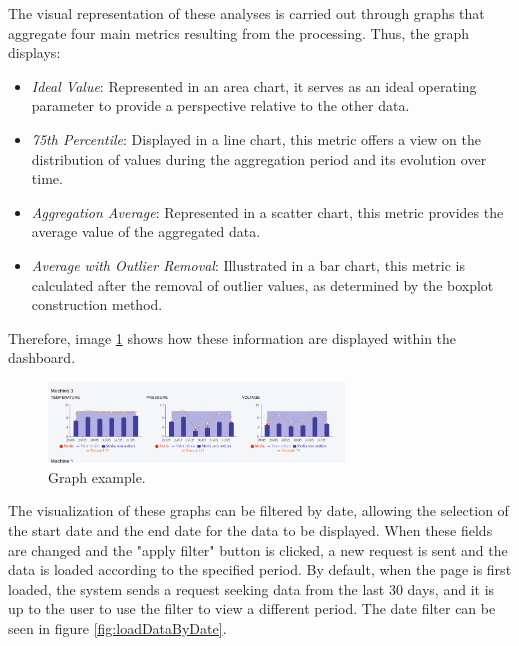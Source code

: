 The visual representation of these analyses is carried out through graphs that aggregate four main metrics resulting from the processing. Thus, the graph displays:

\begin{itemize}
    \item \textit{Ideal Value}: Represented in an area chart, it serves as an ideal operating parameter to provide a perspective relative to the other data.
    \item \textit{75th Percentile}: Displayed in a line chart, this metric offers a view on the distribution of values during the aggregation period and its evolution over time.
    \item \textit{Aggregation Average}: Represented in a scatter chart, this metric provides the average value of the aggregated data.
    \item \textit{Average with Outlier Removal}: Illustrated in a bar chart, this metric is calculated after the removal of outlier values, as determined by the boxplot construction method.
\end{itemize}

Therefore, image \ref{fig:graphData} shows how these information are displayed within the dashboard.

\begin{figure}[htbp]
	\centering
	\includegraphics[width=0.7\textwidth]{images/graphData.png}
	\caption{Graph example.}
	\label{fig:graphData}
\end{figure}


The visualization of these graphs can be filtered by date, allowing the selection of the start date and the end date for the data to be displayed. When these fields are changed and the "apply filter" button is clicked, a new request is sent and the data is loaded according to the specified period. By default, when the page is first loaded, the system sends a request seeking data from the last 30 days, and it is up to the user to use the filter to view a different period. The date filter can be seen in figure \ref{fig:loadDataByDate}.


